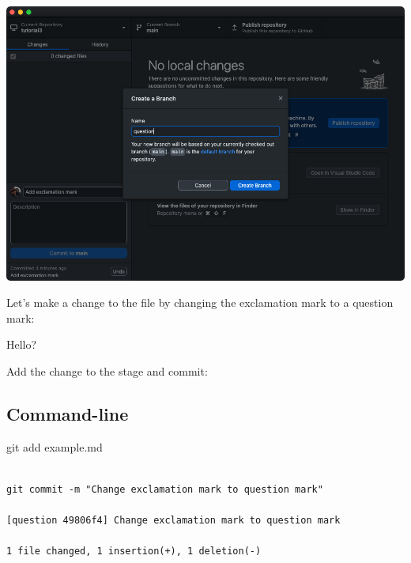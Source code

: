 \documentclass[
  letterpaper,
  DIV=11,
  numbers=noendperiod]{scrartcl}
\newenvironment{Shaded}{\begin{snugshade}}{\end{snugshade}}
\newcommand{\FunctionTok}[1]{\textcolor[rgb]{0.28,0.35,0.67}{#1}}
\newcommand{\NormalTok}[1]{\textcolor[rgb]{0.00,0.23,0.31}{#1}}
\begin{document}
\includegraphics{images/image37.png}

Let's make a change to the file by changing the exclamation mark to a
question mark:

\begin{tcolorbox}[enhanced jigsaw, rightrule=.15mm, opacitybacktitle=0.6, bottomtitle=1mm, colbacktitle=quarto-callout-note-color!10!white, toprule=.15mm, title=\textcolor{quarto-callout-note-color}{\faInfo}\hspace{0.5em}{example.md}, toptitle=1mm, left=2mm, leftrule=.75mm, titlerule=0mm, bottomrule=.15mm, colframe=quarto-callout-note-color-frame, arc=.35mm, coltitle=black, breakable, colback=white, opacityback=0]

Hello?

\end{tcolorbox}

Add the change to the stage and commit:

\subsection{Command-line}

\begin{Shaded}
\begin{Highlighting}[]
\FunctionTok{git}\NormalTok{ add example.md}
\end{Highlighting}
\end{Shaded}

\begin{verbatim}

git commit -m "Change exclamation mark to question mark"

[question 49806f4] Change exclamation mark to question mark

1 file changed, 1 insertion(+), 1 deletion(-)
\end{verbatim}
\end{document}
